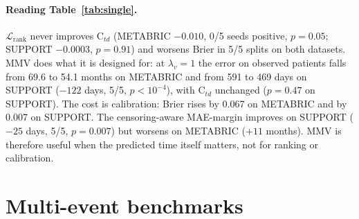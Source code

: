 \documentclass[11pt,a4paper]{article}
\newcommand{\Lrank}{$\mathcal{L}_{\mathrm{rank}}$}
\newcommand{\Ctd}{C$_{td}$}
\begin{document}
\paragraph{Reading Table~\ref{tab:single}.} \Lrank{} never improves \Ctd{} (METABRIC $-0.010$, 0/5 seeds positive,
$p=0.05$; SUPPORT $-0.0003$, $p=0.91$) and worsens Brier in 5/5 splits on both datasets. MMV does what it is designed
for: at $\lambda_v=1$ the error on observed patients falls from 69.6 to 54.1 months on METABRIC and from 591 to 469 days
on SUPPORT ($-122$ days, 5/5, $p<10^{-4}$), with \Ctd{} unchanged ($p=0.47$ on SUPPORT). The cost is calibration: Brier
rises by 0.067 on METABRIC and by 0.007 on SUPPORT. The censoring-aware MAE-margin improves on SUPPORT ($-25$ days,
5/5, $p=0.007$) but worsens on METABRIC ($+11$ months). MMV is therefore useful when the predicted time itself matters,
not for ranking or calibration.

\section{Multi-event benchmarks}\label{sec:multi}
\end{document}
